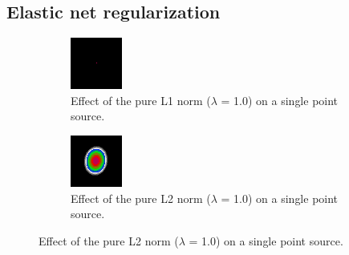 \subsection{Elastic net regularization} \label{cd:reg}
\begin{figure}[h]
	\centering
	\begin{subfigure}[b]{0.3\linewidth}
		\includegraphics[width=\linewidth]{./chapters/03.distribution/L1.png}
		\caption{Effect of the pure L1 norm ($\lambda$ = 1.0) on a single point source.}
		\label{cd:elastic:L1}
	\end{subfigure}
	\begin{subfigure}[b]{0.3\linewidth}
		\includegraphics[width=\linewidth]{./chapters/03.distribution/L2.png}
		\caption{Effect of the pure L2 norm ($\lambda$ = 1.0) on a single point source.}
		\label{cd:elastic:L2}
	\end{subfigure}
	

\end{figure}
